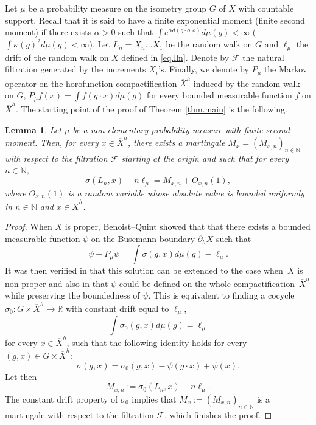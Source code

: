 \documentclass[10pt]{amsart}
\theoremstyle{plain}
\newtheorem{lemma}[theorem]{Lemma}
\theoremstyle{definition}
\newcommand\R{\mathbb{R}}
\newcommand\N{\mathbb{N}}
\begin{document}
Let $\mu$ be a probability measure on the isometry group $G$ of $X$ with countable support. Recall that it is said to have a finite exponential moment (\resp finite second moment) if there exists $\alpha>0$ such that $\int e^{\alpha d(g \cdot o, o)} d\mu(g)<\infty$ (\resp $\int \kappa(g)^2 d\mu(g)<\infty$). Let $L_n=X_n\dots X_1$ be the random walk on $G$ and $\ell_{\mu}$ the drift of the random walk on $X$ defined in \eqref{eq.lln}.
Denote by $\mathcal{F}$ the natural filtration generated by the increments $X_i$'s. Finally, we denote by $P_{\mu}$ the Markov operator on the horofunction compactification $\overline{X}^h$ induced by the random walk on $G$, \ie $P_{\mu}f(x)=\int{f(g\cdot x) d\mu(g)}$ for every bounded measurable function $f$ on $\overline{X}^h$. The starting point of the proof of Theorem \ref{thm.main} is the following.

\begin{lemma}\label{lemma.martingale.dec}
Let $\mu$ be a non-elementary probability measure with finite second moment. Then, for every $x\in \overline{X}^h$, there exists a martingale $M_x=(M_{x,n})_{n\in \N}$ with respect to the filtration $\mathcal{F}$ starting at the origin and such that for every $n\in \N$,\vspace*{-3pt}
\[
\sigma(L_n, x)-n\ell_{\mu} = M_{x,n} + O_{x,n}(1),
\]
where $O_{x,n}(1)$ is a random variable whose absolute value is bounded uniformly in $n\in \N$ and $x\in \overline{X}^h$.
\end{lemma}

\begin{proof}
When $X$ is proper, Benoist--Quint \cite[Prop.\,4.6]{BQ.hyperbolic} showed that that there exists a bounded measurable function $\psi$ on the Busemann boundary $\partial_h X$ such that
\[
\psi - P_{\mu} \psi = \int{\sigma(g,x) d\mu(g)} - \ell_\mu.
\]
It was then verified in \cite{horbez} that this solution can be extended to the case when~$X$ is non-proper and also in \cite{aoun-sert} that $\psi$ could be defined on the whole compactification~$\overline{X}^h$ while preserving the boundedness of $\psi$. This is equivalent to finding a cocycle \hbox{$\sigma_0: G\times \overline{X}^h \to \R$} with constant drift equal to $\ell_{\mu}$, \ie 
\[
\int{\sigma_0(g,x) d\mu(g)}=\ell_{\mu}
\]
for every $x\in \overline{X}^h$, such that the following identity holds for every $(g,x)\in G\times \overline{X}^h $:
\begin{equation}\label{cocycle.decomposition}\sigma(g,x) = \sigma_0(g,x) - \psi(g\cdot x)+\psi(x).\end{equation}
Let then
\begin{equation}\label{equation.martingale}M_{x,n}:=\sigma_0(L_n, x)-n\ell_{\mu}.\end{equation}
The constant drift property of $\sigma_0$ implies that $M_x:=(M_{x,n})_{n\in \N}$ is a martingale with respect to the filtration $\mathcal{F}$, which finishes the proof.
\end{proof}
\end{document}
